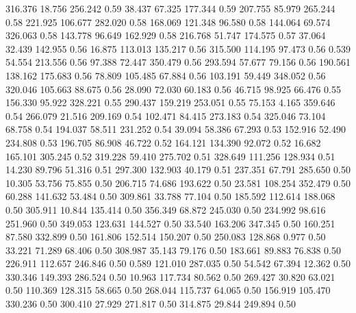  316.376   18.756  256.242         0.59
  38.437   67.325  177.344         0.59
 207.755   85.979  265.244         0.58
 221.925  106.677  282.020         0.58
 168.069  121.348   96.580         0.58
 144.064   69.574  326.063         0.58
 143.778   96.649  162.929         0.58
 216.768   51.747  174.575         0.57
  37.064   32.439  142.955         0.56
  16.875  113.013  135.217         0.56
 315.500  114.195   97.473         0.56
   0.539   54.554  213.556         0.56
  97.388   72.447  350.479         0.56
 293.594   57.677   79.156         0.56
 190.561  138.162  175.683         0.56
  78.809  105.485   67.884         0.56
 103.191   59.449  348.052         0.56
 320.046  105.663   88.675         0.56
  28.090   72.030   60.183         0.56
  46.715   98.925   66.476         0.55
 156.330   95.922  328.221         0.55
 290.437  159.219  253.051         0.55
  75.153    4.165  359.646         0.54
 266.079   21.516  209.169         0.54
 102.471   84.415  273.183         0.54
 325.046   73.104   68.758         0.54
 194.037   58.511  231.252         0.54
  39.094   58.386   67.293         0.53
 152.916   52.490  234.808         0.53
 196.705   86.908   46.722         0.52
 164.121  134.390   92.072         0.52
  16.682  165.101  305.245         0.52
 319.228   59.410  275.702         0.51
 328.649  111.256  128.934         0.51
  14.230   89.796   51.316         0.51
 297.300  132.903   40.179         0.51
 237.351   67.791  285.650         0.50
  10.305   53.756   75.855         0.50
 206.715   74.686  193.622         0.50
  23.581  108.254  352.479         0.50
  60.288  141.632   53.484         0.50
 309.861   33.788   77.104         0.50
 185.592  112.614  188.068         0.50
 305.911   10.844  135.414         0.50
 356.349   68.872  245.030         0.50
 234.992   98.616  251.960         0.50
 349.053  123.631  144.527         0.50
  33.540  163.206  347.345         0.50
 160.251   87.580  332.899         0.50
 161.806  152.514  150.207         0.50
 250.083  128.868    0.977         0.50
  33.221   71.289   68.406         0.50
 308.987   35.143   79.176         0.50
 183.661   89.883   76.838         0.50
 226.911  112.657  246.846         0.50
   0.589  121.010  287.035         0.50
  54.542   67.394   12.362         0.50
 330.346  149.393  286.524         0.50
  10.963  117.734   80.562         0.50
 269.427   30.820   63.021         0.50
 110.369  128.315   58.665         0.50
 268.044  115.737   64.065         0.50
 156.919  105.470  330.236         0.50
 300.410   27.929  271.817         0.50
 314.875   29.844  249.894         0.50
